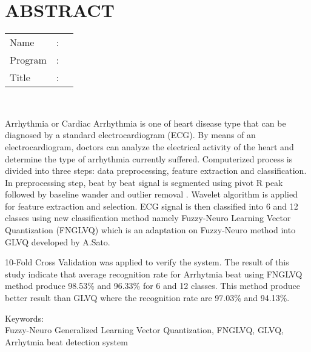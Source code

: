 %
%
%

\chapter*{ABSTRACT}

\vspace*{0.2cm}

\noindent \begin{tabular}{l l p{11.0cm}}
	Name&: & \penulis \\
	Program&: & \programstudi \\
	Title&: & \judulInggris \\
\end{tabular} \\ 

\vspace*{0.5cm}

\noindent
Arrhythmia or Cardiac Arrhythmia is one of heart
disease type that can be diagnosed by a standard electrocardiogram (ECG). By
means of an electrocardiogram, doctors can analyze the electrical activity of
the heart and determine the type of arrhythmia currently suffered. Computerized
process is divided into three steps: data preprocessing, feature extraction and
classification. In preprocessing step, beat by beat signal is segmented using
pivot R peak followed by baseline wander and outlier removal . Wavelet algorithm
is applied for feature extraction and selection. ECG signal is then classified
into 6 and 12 classes using new classification method namely  Fuzzy-Neuro
Learning Vector Quantization (FNGLVQ) which is an adaptation on Fuzzy-Neuro
method into GLVQ developed by A.Sato.

10-Fold Cross Validation was applied to verify the system. The result of this
study indicate that average recognition rate for Arrhytmia beat using
FNGLVQ method produce 98.53\% and 96.33\% for 6 and 12 classes. This method
produce better result than GLVQ where the recognition rate are 97.03\% and
94.13\%.
\\


\vspace*{0.2cm}

\noindent Keywords: \\ 
\noindent Fuzzy-Neuro Generalized Learning Vector Quantization, FNGLVQ,
GLVQ, Arrhytmia beat detection system\\

\newpage